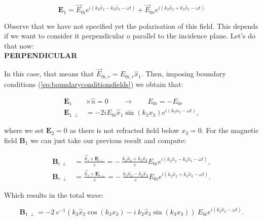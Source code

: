 \begin{equation}
	\mathbf{E}_{1} = \vec{E}_{0i} e^{i\left(k_{2} \hat{x}_{2} - k_{3} \hat{x}_{3} -\omega t\right)} + \vec{E}_{0r} e^{i\left(k_{2} \hat{x}_{2} + k_{3} \hat{x}_{3} -\omega t\right)}
\end{equation}

Observe that we have not specified yet the polarisation of this field. This depends if we want to consider it perpendicular o parallel to the incidence plane. Let's do that now:\\
	
\textbf{PERPENDICULAR}
	
In this case, that means that $\vec{E}_{0i,r} = E_{0i,r} \hat{x}_{1}$.  Then, imposing boundary conditions (\ref{eq:boundaryconditionsfields}) we obtain that:
	
\begin{equation}
	\begin{split}
		\mathbf{E}_{1}& \times \hat{n} = 0 \qquad \rightarrow \qquad E_{0i} = - E_{0r} \qquad \\
		\mathbf{E}_{1 \: \perp}& = - 2 i E_{0i} \hat{x}_{1} \sin\left(k_{3} x_{3}\right) e^{i \left(k_{2} x_{2} - \omega t \right)},
	\end{split}
\end{equation}

where we set $\mathbf{E}_{2} =0$ as there is not refracted field below $x_{3} =0$. For the magnetic field $\mathbf{B}_{1}$ we can just take our previous result and compute:
	
\begin{equation}
	\begin{split}
		\mathbf{B}_{i \: \perp} &= \frac{\vec{k}_{i} \times \mathbf{E}_{i \perp}}{c} = -\: \frac{k_{3} \hat{x}_{2} + k_{2} \hat{x}_{3}}{c}  E_{0i}   e^{i \left(k_{2} \hat{x}_{2} -k_{3} \hat{x}_{3}- \omega t \right)},\\
		\mathbf{B}_{r \: \perp} &= \frac{\vec{k}_{r} \times \mathbf{E}_{r \perp}}{c} = - \: \frac{k_{3} \hat{x}_{2} - k_{2} \hat{x}_{3}}{c}  E_{0i}   e^{i \left(k_{2} \hat{x}_{2}  + k_{3} \hat{x}_{3}- \omega t \right)}.
	\end{split}
\end{equation}

Which results in the total wave:

\begin{equation}
	\mathbf{B}_{1 \: \perp} = -2 \: c^{-1} \left(k_{3} \hat{x}_{2} \cos(k_{3} x_{3}) - i \: k_{2} \hat{x}_{3} \sin(k_{3} x_{3}) \right) \:   E_{0i}   e^{i \left(k_{2} \hat{x}_{2} - \omega t \right)}.
\end{equation}
	
